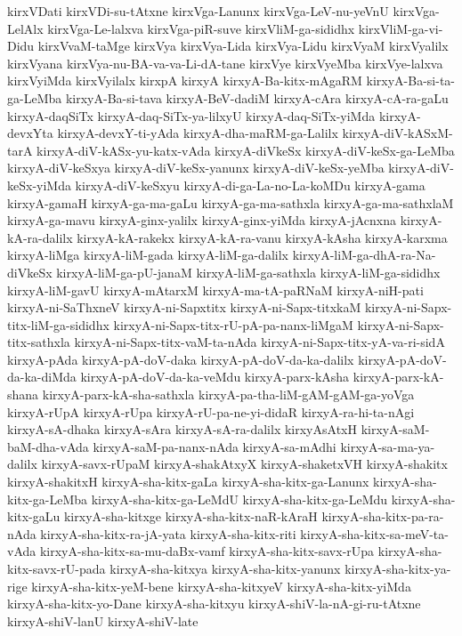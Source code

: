 {kirxVDati
kirxVDi-su-tAtxne
kirxVga-Lanunx
kirxVga-LeV-nu-yeVnU
kirxVga-LelAlx
kirxVga-Le-lalxva
kirxVga-piR-suve
kirxVliM-ga-sididhx
kirxVliM-ga-vi-Didu
kirxVvaM-taMge
kirxVya
kirxVya-Lida
kirxVya-Lidu
kirxVyaM
kirxVyalilx
kirxVyana
kirxVya-nu-BA-va-va-Li-dA-tane
kirxVye
kirxVyeMba
kirxVye-lalxva
kirxVyiMda
kirxVyilalx
kirxpA
kirxyA
kirxyA-Ba-kitx-mAgaRM
kirxyA-Ba-si-ta-ga-LeMba
kirxyA-Ba-si-tava
kirxyA-BeV-dadiM
kirxyA-cAra
kirxyA-cA-ra-gaLu
kirxyA-daqSiTx
kirxyA-daq-SiTx-ya-lilxyU
kirxyA-daq-SiTx-yiMda
kirxyA-devxYta
kirxyA-devxY-ti-yAda
kirxyA-dha-maRM-ga-Lalilx
kirxyA-diV-kASxM-tarA
kirxyA-diV-kASx-yu-katx-vAda
kirxyA-diVkeSx
kirxyA-diV-keSx-ga-LeMba
kirxyA-diV-keSxya
kirxyA-diV-keSx-yanunx
kirxyA-diV-keSx-yeMba
kirxyA-diV-keSx-yiMda
kirxyA-diV-keSxyu
kirxyA-di-ga-La-no-La-koMDu
kirxyA-gama
kirxyA-gamaH
kirxyA-ga-ma-gaLu
kirxyA-ga-ma-sathxla
kirxyA-ga-ma-sathxlaM
kirxyA-ga-mavu
kirxyA-ginx-yalilx
kirxyA-ginx-yiMda
kirxyA-jAcnxna
kirxyA-kA-ra-dalilx
kirxyA-kA-rakekx
kirxyA-kA-ra-vanu
kirxyA-kAsha
kirxyA-karxma
kirxyA-liMga
kirxyA-liM-gada
kirxyA-liM-ga-dalilx
kirxyA-liM-ga-dhA-ra-Na-diVkeSx
kirxyA-liM-ga-pU-janaM
kirxyA-liM-ga-sathxla
kirxyA-liM-ga-sididhx
kirxyA-liM-gavU
kirxyA-mAtarxM
kirxyA-ma-tA-paRNaM
kirxyA-niH-pati
kirxyA-ni-SaThxneV
kirxyA-ni-Sapxtitx
kirxyA-ni-Sapx-titxkaM
kirxyA-ni-Sapx-titx-liM-ga-sididhx
kirxyA-ni-Sapx-titx-rU-pA-pa-nanx-liMgaM
kirxyA-ni-Sapx-titx-sathxla
kirxyA-ni-Sapx-titx-vaM-ta-nAda
kirxyA-ni-Sapx-titx-yA-va-ri-sidA
kirxyA-pAda
kirxyA-pA-doV-daka
kirxyA-pA-doV-da-ka-dalilx
kirxyA-pA-doV-da-ka-diMda
kirxyA-pA-doV-da-ka-veMdu
kirxyA-parx-kAsha
kirxyA-parx-kA-shana
kirxyA-parx-kA-sha-sathxla
kirxyA-pa-tha-liM-gAM-gAM-ga-yoVga
kirxyA-rUpA
kirxyA-rUpa
kirxyA-rU-pa-ne-yi-didaR
kirxyA-ra-hi-ta-nAgi
kirxyA-sA-dhaka
kirxyA-sAra
kirxyA-sA-ra-dalilx
kirxyAsAtxH
kirxyA-saM-baM-dha-vAda
kirxyA-saM-pa-nanx-nAda
kirxyA-sa-mAdhi
kirxyA-sa-ma-ya-dalilx
kirxyA-savx-rUpaM
kirxyA-shakAtxyX
kirxyA-shaketxVH
kirxyA-shakitx
kirxyA-shakitxH
kirxyA-sha-kitx-gaLa
kirxyA-sha-kitx-ga-Lanunx
kirxyA-sha-kitx-ga-LeMba
kirxyA-sha-kitx-ga-LeMdU
kirxyA-sha-kitx-ga-LeMdu
kirxyA-sha-kitx-gaLu
kirxyA-sha-kitxge
kirxyA-sha-kitx-naR-kAraH
kirxyA-sha-kitx-pa-ra-nAda
kirxyA-sha-kitx-ra-jA-yata
kirxyA-sha-kitx-riti
kirxyA-sha-kitx-sa-meV-ta-vAda
kirxyA-sha-kitx-sa-mu-daBx-vamf
kirxyA-sha-kitx-savx-rUpa
kirxyA-sha-kitx-savx-rU-pada
kirxyA-sha-kitxya
kirxyA-sha-kitx-yanunx
kirxyA-sha-kitx-ya-rige
kirxyA-sha-kitx-yeM-bene
kirxyA-sha-kitxyeV
kirxyA-sha-kitx-yiMda
kirxyA-sha-kitx-yo-Dane
kirxyA-sha-kitxyu
kirxyA-shiV-la-nA-gi-ru-tAtxne
kirxyA-shiV-lanU
kirxyA-shiV-late
}
